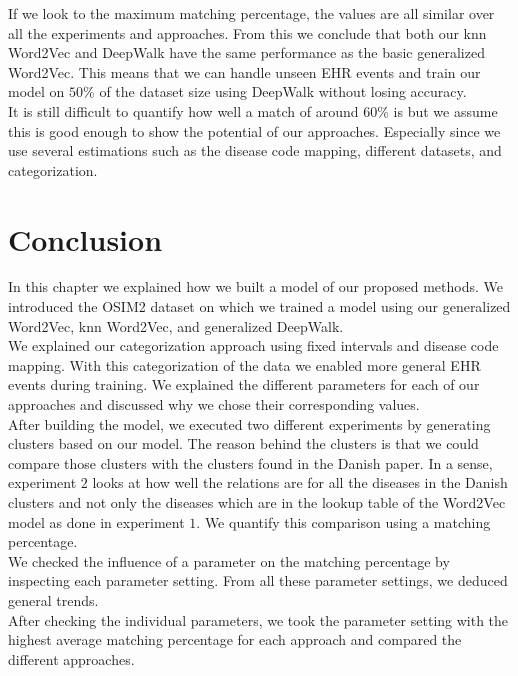 If we look to the maximum matching percentage, the values are all similar over all the experiments and approaches. From this we conclude that both our knn Word2Vec and DeepWalk have the same performance as the basic generalized Word2Vec. This means that we can handle unseen EHR events and train our model on $50$\% of the dataset size using DeepWalk without losing accuracy. \\

It is still difficult to quantify how well a match of around $60$\% is but we assume this is good enough to show the potential of our approaches. Especially since we use several estimations such as the disease code mapping, different datasets, and categorization. 

\section{Conclusion}

In this chapter we explained how we built a model of our proposed methods. We introduced the OSIM2 dataset on which we trained a model using our generalized Word2Vec, knn Word2Vec, and generalized DeepWalk. \\
We explained our categorization approach using fixed intervals and disease code mapping. With this categorization of the data we enabled more general EHR events during training. We explained the different parameters for each of our approaches and discussed why we chose their corresponding values. \\

After building the model, we executed two different experiments by generating clusters based on our model. The reason behind the clusters is that we could compare those clusters with the clusters found in the Danish paper. In a sense, experiment $2$ looks at how well the relations are for all the diseases in the Danish clusters and not only the diseases which are in the lookup table of the Word2Vec model as done in experiment $1$. We quantify this comparison using a matching percentage. \\

We checked the influence of a parameter on the matching percentage by inspecting each parameter setting. From all these parameter settings, we deduced general trends. \\
After checking the individual parameters, we took the parameter setting with the highest average matching percentage for each approach and compared the different approaches. \\

